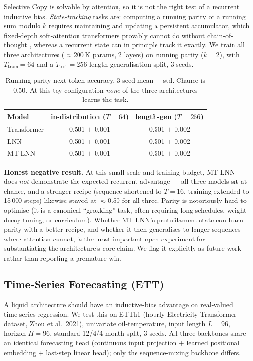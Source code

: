 \documentclass[11pt]{article}
\theoremstyle{definition}
\begin{document}
Selective Copy is solvable by attention, so it is not the right test of a recurrent inductive bias. \emph{State-tracking} tasks are: computing a running parity or a running sum modulo $k$ requires maintaining and updating a persistent accumulator, which fixed-depth soft-attention transformers provably cannot do without chain-of-thought \citep{hahn2020theoretical, merrill2023parallelism}, whereas a recurrent state can in principle track it exactly. We train all three architectures ($\approx$200\,K params, 2 layers) on running parity ($k{=}2$), with $T_\text{train}{=}64$ and a $T_\text{test}{=}256$ length-generalisation split, 3 seeds.

\begin{table}[h]
\centering
\caption{Running-parity next-token accuracy, 3-seed mean $\pm$ std. Chance is 0.50. At this toy configuration \emph{none} of the three architectures learns the task.}
\label{tab:state_tracking}
\begin{tabular}{lcc}
\toprule
Model & in-distribution ($T{=}64$) & length-gen ($T{=}256$) \\
\midrule
Transformer  & 0.501 $\pm$ 0.001 & 0.501 $\pm$ 0.002 \\
LNN          & 0.501 $\pm$ 0.001 & 0.501 $\pm$ 0.002 \\
MT-LNN       & 0.501 $\pm$ 0.001 & 0.501 $\pm$ 0.002 \\
\bottomrule
\end{tabular}
\end{table}

\textbf{Honest negative result.} At this small scale and training budget, MT-LNN does \emph{not} demonstrate the expected recurrent advantage — all three models sit at chance, and a stronger recipe (sequence shortened to $T=16$, training extended to 15\,000 steps) likewise stayed at $\approx$0.50 for all three. Parity is notoriously hard to optimise (it is a canonical ``grokking'' task, often requiring long schedules, weight decay tuning, or curriculum). Whether MT-LNN's protofilament state can learn parity with a better recipe, and whether it then generalises to longer sequences where attention cannot, is the most important open experiment for substantiating the architecture's core claim. We flag it explicitly as future work rather than reporting a premature win.

\subsection{Time-Series Forecasting (ETT)}
\label{sec:ett}
A liquid architecture should have an inductive-bias advantage on real-valued time-series regression. We test this on ETTh1 (hourly Electricity Transformer dataset, Zhou et al.\ 2021), univariate oil-temperature, input length $L=96$, horizon $H=96$, standard 12/4/4-month split, 3 seeds. All three backbones share an identical forecasting head (continuous input projection + learned positional embedding + last-step linear head); only the sequence-mixing backbone differs.
\end{document}
